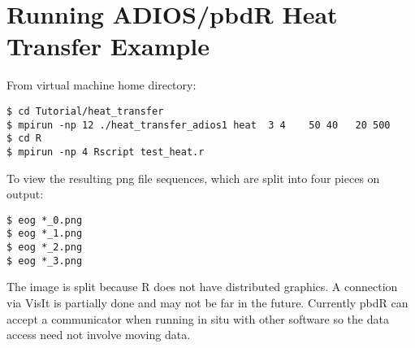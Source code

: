 \documentclass{article}
\begin{document}
\section{Running ADIOS/pbdR Heat Transfer Example}
From virtual machine home directory:
\begin{verbatim}
$ cd Tutorial/heat_transfer
$ mpirun -np 12 ./heat_transfer_adios1 heat  3 4    50 40   20 500
$ cd R
$ mpirun -np 4 Rscript test_heat.r
\end{verbatim}
To view the resulting png file sequences, which are split into four pieces on output:
\begin{verbatim}
$ eog *_0.png
$ eog *_1.png
$ eog *_2.png
$ eog *_3.png
\end{verbatim}
The image is split because R does not have distributed graphics. A
connection via VisIt is partially done and may not be far in the
future. Currently pbdR can accept a communicator when running in situ
with other software so the data access need not involve moving data.
\end{document}
